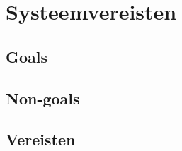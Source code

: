 
\chapter{Systeemvereisten}
\label{ch:systeemvereisten}


\section{Goals}
\label{sec:goals}


\section{Non-goals}
\label{sec:non-goals}


\section{Vereisten}
\label{sec:vereisten}


